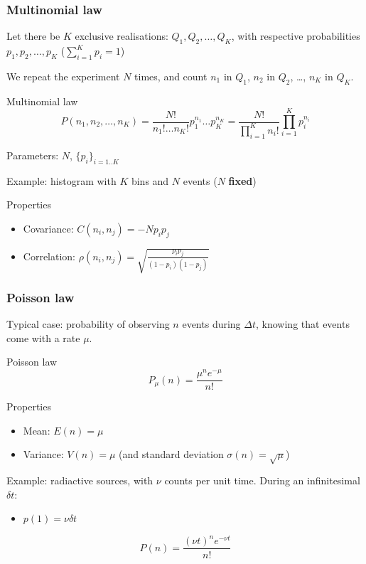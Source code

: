 \documentclass[9pt]{beamer}
\newif\ifmynote
\newcommand\mynote[1]{%
\ifmynote \textbf{#1} \else \fi
}
\begin{document}
\begin{frame}
 \frametitle{Multinomial law}
 
 \mynote{Écrire au tableau}
 
 Let there be $K$ exclusive realisations: $Q_1, Q_2, \dots, Q_K$, with respective probabilities $p_1, p_2, \dots, p_K$ ($\sum_{i=1}^K p_i = 1$)
 
 We repeat the experiment $N$ times, and count $n_1$ in $Q_1$, $n_2$ in $Q_2$, \dots, $n_K$ in $Q_K$.
 
 \begin{block}{Multinomial law}
  $$P(n_1,n_2,\dots,n_K) = \frac{N!}{n_1! \dots n_K!} p_1^{n_1} \dots p_K^{n_K} = \frac{N!}{\prod_{i=1}^{K} n_i!} \prod_{i=1}^K p_i^{n_i}$$
  
  Parameters: $N$, $\{p_i\}_{i=1..K}$
 \end{block}
 
 Example: histogram with $K$ bins and $N$ events ($N$ \textbf{fixed})

 \begin{block}{Properties}
  \begin{itemize}
   \item Covariance: $C(n_i,n_j) = -N p_i p_j$
   \item Correlation: $\rho (n_i,n_j) = \sqrt{\frac{p_i p_j}{(1-p_i)(1-p_j)}}$
  \end{itemize}
 \end{block}

\end{frame}

\begin{frame}
 \frametitle{Poisson law}
 
 \mynote{Écrire au tableau}
 
 Typical case: probability of observing $n$ events during $\Delta t$, knowing that events come with a rate $\mu$. 
 
 \begin{block}{Poisson law}
  $$P_\mu(n) = \frac{\mu^n e^{-\mu}}{n!}$$
 \end{block}
 
 \begin{block}{Properties}
  \begin{itemize}
   \item Mean: $E(n) = \mu$
   \item Variance: $V(n) = \mu$ (and standard deviation $\sigma(n) = \sqrt{\mu}$)
  \end{itemize}
 \end{block}

 Example: radiactive sources, with $\nu$ counts per unit time. During an infinitesimal $\delta t$:
 
 \begin{itemize}
  \item $p(1) = \nu \delta t$ 
 \end{itemize}
 
 $$P(n) = \frac{(\nu t)^n e^{-\nu t}}{n!}$$


\end{frame}
\end{document}
